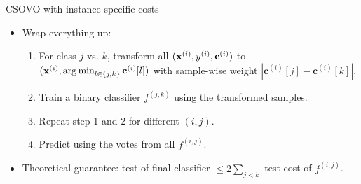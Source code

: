 \documentclass[11pt,compress,t,notes=noshow, xcolor=table]{beamer}
\newcommand{\cv}{\mathbf{c}}    %
\begin{document}
\begin{vbframe}{CSOVO with instance-specific costs}
    \footnotesize
    \begin{itemize}

    \item Wrap everything up:
    \begin{enumerate}
        \footnotesize
        \item For class $j$ vs. $k$, transform all $(\xi, \yi, \cv^{(i)})$ to $(\xi, \argmin_{l \in \{j, k\}} \cv^{(i)}[l])$ with sample-wise weight $|\cv^{(i)}[j] - \cv^{(i)}[k]|$.
        \vspace{5pt}
        
        \item Train a binary classifier $f^{(j, k)}$ using the transformed samples.
        \vspace{5pt}
        
        \item Repeat step 1 and 2 for different $(i, j)$.
        \vspace{5pt}
        
        \item Predict using the votes from all $f^{(i, j)}$.
    \end{enumerate}
    \vspace{5pt}

    \item Theoretical guarantee: test of final classifier $\leq 2\sum_{j < k}$ test cost of $f^{(i, j)}$. 
    \end{itemize}
\end{vbframe}
\end{document}
